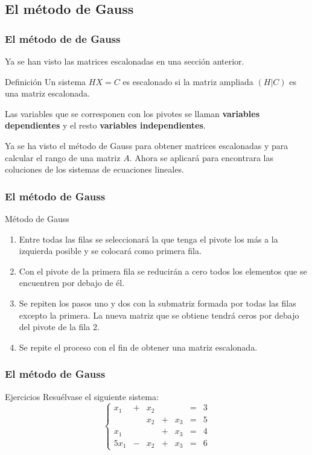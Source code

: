 \documentclass[12pt]{article}
\begin{document}
  \subsection{El m\'etodo de Gauss}

               \begin{frame}
    \frametitle{El m\'etodo de de Gauss}
    Ya se han visto las matrices escalonadas en una secci\'on anterior. 
       \begin{block}{Definici\'on}
Un sistema $HX=C$ es escalonado si la matriz ampliada $(H|C)$ es una matriz escalonada.

Las variables que se corresponen con los pivotes se llaman \textbf{variables dependientes} y el resto \textbf{variables independientes}.
\end{block}

Ya se ha visto el m\'etodo de Gauss para obtener matrices escalonadas y para calcular el rango de una matriz $A$. Ahora se aplicar\'a para encontrara las coluciones de los sistemas de ecuaciones lineales.
  \end{frame} 
  
               \begin{frame}
    \frametitle{El m\'etodo de Gauss}
       \begin{block}{M\'etodo de Gauss}
\begin{enumerate}
\item Entre todas las filas se seleccionar\'a la que tenga el pivote los m\'as a la izquierda posible y se colocar\'a como primera fila.
\item Con el pivote de la primera fila se reducir\'an a cero todos los elementos que se encuentren por debajo de \'el.
\item Se repiten los pasos uno y dos con la submatriz formada por todas las filas excepto la primera. La nueva matriz que se obtiene tendr\'a ceros por debajo del pivote de la fila 2.
\item Se repite el proceso con el fin de obtener una matriz escalonada.
\end{enumerate}
\end{block}
  \end{frame} 
  

\begin{frame}
\frametitle{El m\'etodo de Gauss}
\begin{block}{Ejercicios}
Resu\'elvase el siguiente sistema:
\[
\left\{\begin{array}{ccccccc}x_1 & + & x_2 &   &   & = & 3 \\  &   & x_2 & + & x_3 & = & 5 \\x_1 &   &   & + & x_3 & = & 4 \\5x_1 & - & x_2 & + & x_3 & = & 6\end{array}\right.
\]

\end{block}
  \end{frame} 
  
\end{document}
